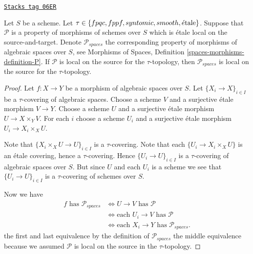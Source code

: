 \begin{lemma}
\label{spaces-descent-lemma-transfer-from-schemes}
\href{https://stacks.math.columbia.edu/tag/06ER}{\texttt{Stacks tag 06ER}}

Let $S$ be a scheme.
Let $\tau \in \{fpqc, \linebreak[0] fppf, \linebreak[0] syntomic, \linebreak[0]
smooth, \linebreak[0] \etale\}$.
Suppose that $\mathcal{P}$ is a property of morphisms of schemes over $S$
which is \'etale local on the source-and-target. Denote $\mathcal{P}_{spaces}$
the corresponding property of morphisms of algebraic spaces over $S$, see
Morphisms of Spaces, Definition \ref{spaces-morphisms-definition-P}.
If $\mathcal{P}$ is local on the source for the $\tau$-topology, then
$\mathcal{P}_{spaces}$ is local on the source for the $\tau$-topology.
\end{lemma}

\begin{proof}
Let $f : X \to Y$ be a morphism of algebraic spaces over $S$.
Let $\{X_i \to X\}_{i \in I}$ be a $\tau$-covering of algebraic spaces.
Choose a scheme $V$ and a surjective \'etale morphism $V \to Y$.
Choose a scheme $U$ and a surjective \'etale morphism $U \to X \times_Y V$.
For each $i$ choose a scheme $U_i$ and a surjective \'etale morphism
$U_i \to X_i \times_X U$.

\medskip\noindent
Note that $\{X_i \times_X U \to U\}_{i \in I}$ is a $\tau$-covering.
Note that each $\{U_i \to X_i \times_X U\}$ is an \'etale covering,
hence a $\tau$-covering. Hence $\{U_i \to U\}_{i \in I}$ is a
$\tau$-covering of algebraic spaces over $S$. But since $U$ and each $U_i$
is a scheme we see that $\{U_i \to U\}_{i \in I}$ is a
$\tau$-covering of schemes over $S$.

\medskip\noindent
Now we have
\begin{align*}
f \text{ has }\mathcal{P}_{spaces}
& \Leftrightarrow
U \to V \text{ has }\mathcal{P} \\
& \Leftrightarrow
\text{each }U_i \to V \text{ has }\mathcal{P} \\
& \Leftrightarrow
\text{each }X_i \to Y\text{ has }\mathcal{P}_{spaces}.
\end{align*}
the first and last equivalence by the definition of
$\mathcal{P}_{spaces}$ the middle equivalence because we assumed
$\mathcal{P}$ is local on the source in the $\tau$-topology.
\end{proof}


